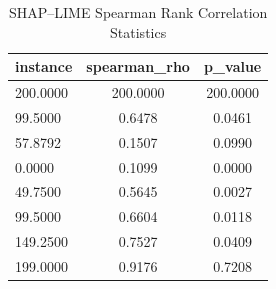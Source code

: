 \begin{table}
\centering
\caption{SHAP–LIME Spearman Rank Correlation Statistics}
\label{tab:agreement}
\begin{tabular}{lcc}
\toprule
instance & spearman_rho & p_value \\
\midrule
200.0000 & 200.0000 & 200.0000 \\
99.5000 & 0.6478 & 0.0461 \\
57.8792 & 0.1507 & 0.0990 \\
0.0000 & 0.1099 & 0.0000 \\
49.7500 & 0.5645 & 0.0027 \\
99.5000 & 0.6604 & 0.0118 \\
149.2500 & 0.7527 & 0.0409 \\
199.0000 & 0.9176 & 0.7208 \\
\bottomrule
\end{tabular}
\end{table}
